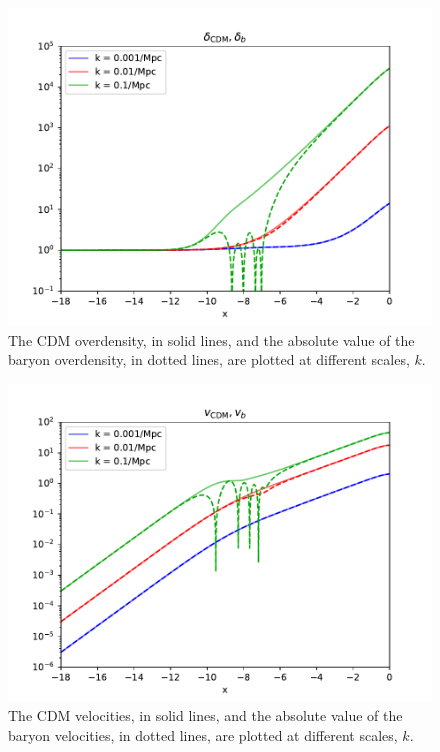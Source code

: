 \documentclass{aa}
\begin{document}
\begin{figure}[h!]
   \includegraphics[scale=0.6]{../figures/milestone3/test_delta_cdm_delta_b.pdf}
   \caption{The CDM overdensity, in solid lines, and the absolute value of the baryon overdensity,
    in dotted lines, are plotted at different scales, $k$.}\label{fig:test1}
\end{figure}

\begin{figure}[h!]
   \includegraphics[scale=0.6]{../figures/milestone3/test_v_cdm_v_b.pdf}
   \caption{The CDM velocities, in solid lines, and the absolute value of the baryon velocities,
    in dotted lines, are plotted at different scales, $k$.}\label{fig:test2}
\end{figure}
\end{document}
